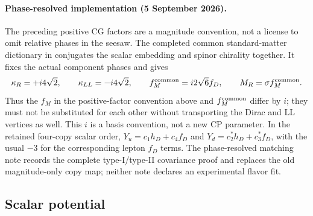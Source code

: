 \documentclass[11pt]{article}
\begin{document}
\paragraph{Phase-resolved implementation (5 September 2026).}
The preceding positive CG factors are a magnitude convention, not a
license to omit relative phases in the seesaw. The completed common
standard-matter dictionary in
 conjugates the scalar embedding
and spinor chirality together. It fixes the actual component phases and gives
\[
 \kappa_R=+i4\sqrt2,\qquad \kappa_{LL}=-i4\sqrt2,\qquad
 f_M^{\rm common}=i2\sqrt6 f_D,\qquad M_R=\sigma f_M^{\rm common}.
\]
Thus the $f_M$ in the positive-factor convention above and
$f_M^{\rm common}$ differ by $i$; they must not be substituted for each
other without transporting the Dirac and LL vertices as well. This $i$
is a basis convention, not a new CP parameter. In the retained four-copy
scalar order, $Y_u=c_1h_D+c_4f_D$ and
$Y_d=c_2^*h_D+c_3^*f_D$, with the usual $-3$ for the corresponding
lepton $f_D$ terms. The phase-resolved matching note records the complete
type-I/type-II covariance proof and replaces the old magnitude-only copy
map; neither note declares an experimental flavor fit.

\subsection{Scalar potential}
\end{document}
